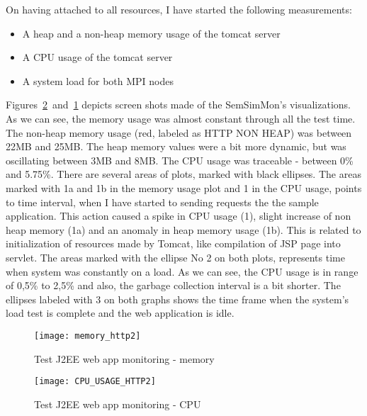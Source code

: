On having attached to all resources, I have started the following measurements:

\begin{itemize}
\item A heap and a non-heap memory usage of the tomcat server
\item A CPU usage of the tomcat server
\item A system load for both MPI nodes
\end{itemize}

Figures~\ref{fig:http_cpu}~and~\ref{fig:http_memory} depicts screen shots made of the SemSimMon\rq{}s visualizations. As we can see, the memory usage was almost constant through all the test time. The non-heap memory usage (red, labeled as HTTP NON HEAP) was between 22MB and 25MB. The heap memory values were a bit more dynamic, but was oscillating between 3MB and 8MB. The CPU usage was traceable - between 0\% and 5.75\%. There are several areas of plots, marked with black ellipses. The areas marked with 1a and 1b in the memory usage plot and 1 in the CPU usage, points to time interval, when I have started to sending requests the the sample application. This action caused a spike in CPU usage (1), slight increase of non heap memory (1a) and an anomaly in heap memory usage (1b). This is related to initialization of resources made by Tomcat, like compilation of JSP page into servlet. The areas marked with the ellipse No 2 on both plots, represents time when system was constantly on a load. As we can see, the CPU usage is in range of 0,5\% to 2,5\% and also, the garbage collection interval is a bit shorter. The ellipses labeled with 3 on both graphs shows the time frame when the system\rq{}s load test is complete and the web application is idle.

\begin{figure}[ht]
\centering
\texttt{[image: memory\_http2]}
\caption{Test J2EE web app monitoring - memory}
\label{fig:http_memory}
\end{figure}

\begin{figure}[ht]
\centering
\texttt{[image: CPU\_USAGE\_HTTP2]}
\caption{Test J2EE web app monitoring - CPU}
\label{fig:http_cpu}
\end{figure}


